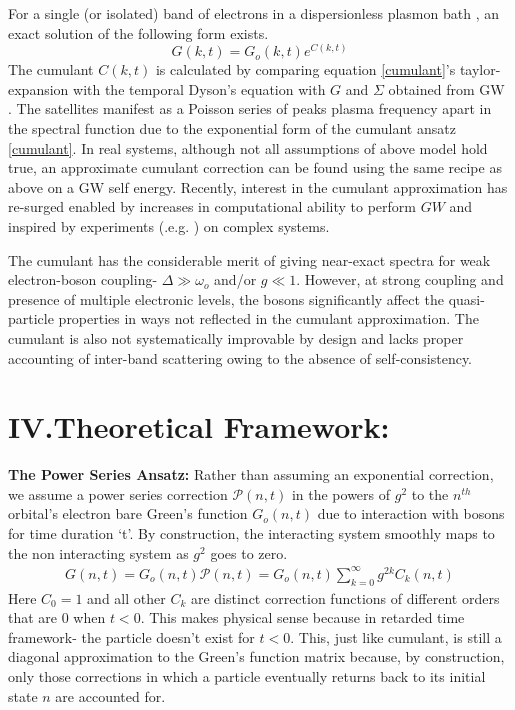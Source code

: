 \documentclass[%
 reprint,
 amsmath,amssymb,
 aps,prl,
floatfix
]{revtex4-2}
\begin{document}
For a single (or isolated) band of electrons in a dispersionless plasmon bath \cite{langreth_singularities_1970}, an exact solution of the following form exists.
\begin{equation}
G(k,t) = G_o(k,t) e^{C(k,t)}
\label{cumulant}
\end{equation} 
The cumulant $C(k,t)$ is calculated by comparing equation \eqref{cumulant}'s taylor-expansion with the temporal Dyson's equation with $G$ and $\Sigma$ obtained from GW \cite{aryasetiawan_multiple_1996}. The satellites manifest as a Poisson series of peaks plasma frequency apart in the spectral function due to the exponential form of the cumulant ansatz \eqref{cumulant}. In real systems, although not all assumptions of above model hold true, an approximate cumulant correction can be found using the same recipe as above on a GW self energy. Recently, interest in the cumulant approximation has re-surged \cite{kas_cumulant_2014,gumhalter_combined_2016,caruso_band_2015,lischner_physical_2013} enabled by increases in computational ability to perform $GW$ and inspired by experiments (.e.g. \cite{guzzo_multiple_2014}) on complex systems.

The cumulant has the considerable merit of giving near-exact spectra for weak electron-boson coupling- $\Delta\gg\omega_o$ and/or $g\ll1$. However, at strong coupling and presence of multiple electronic levels, the bosons significantly affect the quasi-particle properties in ways not reflected in the cumulant approximation. The cumulant is also not systematically improvable by design and lacks proper accounting of inter-band scattering owing to the absence of self-consistency. 

\section{IV.Theoretical Framework:}
\textbf{The Power Series Ansatz: }Rather than assuming an exponential correction, we assume a power series correction $\mathcal{P}(n,t)$ in the powers of  $g^2$ to the $n^{th}$ orbital's electron bare Green's function $G_o(n,t)$ due to interaction with bosons for time duration `t'. By construction, the interacting system smoothly maps to the non interacting system as $g^2$ goes to zero. 
\begin{equation}
\begin{aligned}
    G(n,t) = G_o(n,t) \mathcal{P}(n,t) = G_o(n,t)\sum_{k=0}^\infty g^{2k} C_k(n,t)
\end{aligned}
\label{eq:Corrected_Greens}
\end{equation}
Here $C_0 = 1$ and all other $C_k$ are distinct correction functions of different orders that are 0 when $t<0$. This makes physical sense because in retarded time framework- the particle doesn't exist for $t<0$. This, just like cumulant, is still a diagonal approximation to the Green's function matrix because, by construction, only those corrections in which a particle eventually returns back to its initial state $n$ are accounted for. 
\end{document}
